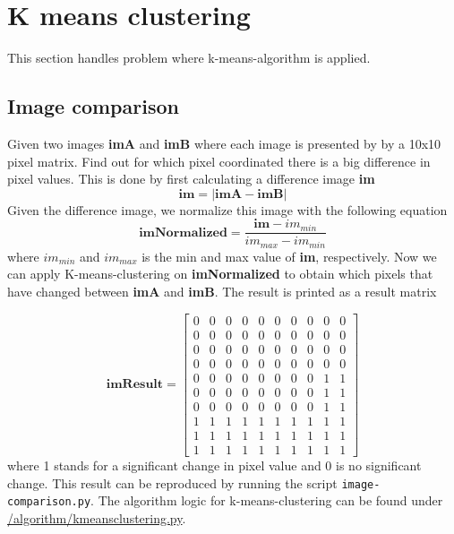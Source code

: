 \documentclass{article}
\begin{document}
    \section{K means clustering}
    This section handles problem where k-means-algorithm is applied.
        \subsection{Image comparison}
        \label{im}
        Given two images \textbf{imA} and \textbf{imB} where each image is presented by by a 10x10 pixel matrix. Find out for which pixel coordinated there is a big difference in pixel values. This is done by first calculating a difference image \textbf{im}
        \begin{equation}
            \textbf{im} = |\textbf{imA} - \textbf{imB}|
        \end{equation}
        Given the difference image, we normalize this image with the following equation
        \begin{equation}
            \textbf{imNormalized} = \frac{\textbf{im} - im_{min}}{im_{max} - im_{min}}
        \end{equation}
        where $im_{min}$ and $im_{max}$ is the min and max value of \textbf{im}, respectively. Now we can apply K-means-clustering on \textbf{imNormalized} to obtain which pixels that have changed between \textbf{imA} and \textbf{imB}. The result is printed as a result matrix 
        
        \begin{equation}
            \textbf{imResult} = 
            \begin{bmatrix}
                0 & 0 & 0 & 0 & 0 & 0 & 0 & 0 & 0 & 0 \\
                0 & 0 & 0 & 0 & 0 & 0 & 0 & 0 & 0 & 0 \\
                0 & 0 & 0 & 0 & 0 & 0 & 0 & 0 & 0 & 0 \\
                0 & 0 & 0 & 0 & 0 & 0 & 0 & 0 & 0 & 0 \\
                0 & 0 & 0 & 0 & 0 & 0 & 0 & 0 & 1 & 1 \\
                0 & 0 & 0 & 0 & 0 & 0 & 0 & 0 & 1 & 1 \\
                0 & 0 & 0 & 0 & 0 & 0 & 0 & 0 & 1 & 1 \\
                1 & 1 & 1 & 1 & 1 & 1 & 1 & 1 & 1 & 1 \\
                1 & 1 & 1 & 1 & 1 & 1 & 1 & 1 & 1 & 1 \\
                1 & 1 & 1 & 1 & 1 & 1 & 1 & 1 & 1 & 1
            \end{bmatrix}
        \end{equation}
        where 1 stands for a significant change in pixel value and 0 is no significant change. This result can be reproduced by running the script \texttt{image-comparison.py}. The algorithm logic for k-means-clustering can be found under \url{/algorithm/kmeansclustering.py}.
        
\end{document}

